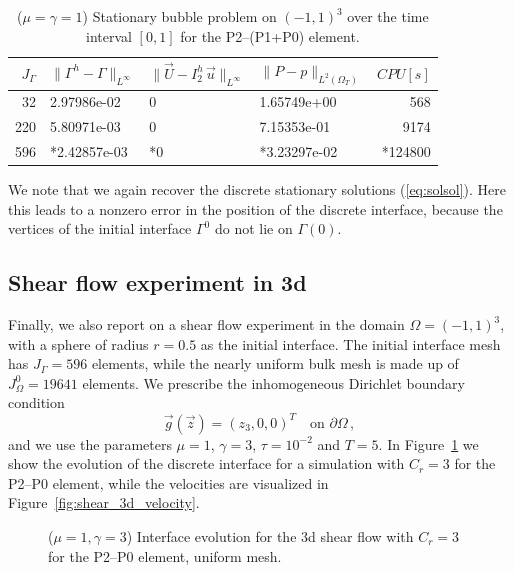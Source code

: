 \documentclass[a4paper,12pt,onecolumn]{article}
\newcommand{\errorXx}{\|\Gamma^h - \Gamma\|_{L^\infty}}
\newcommand{\errorUu}[1]{\|\vec U - I^h_{#1}\,\vec u\|_{L^\infty}}
\newcommand{\LerrorPp}{\|P - p\|_{L^2(\Omega_T)}}
\begin{document}
\begin{table}
 \center
\begin{tabular}{rlllr}
\hline
$J_\Gamma$ & $\errorXx$ & $\errorUu2$ & $\LerrorPp$ & $CPU[s]$ \\
\hline
 32 & 2.97986e-02 & 0 & 1.65749e+00 &  568 \\
220 & 5.80971e-03 & 0 & 7.15353e-01 & 9174 \\
596 & *2.42857e-03& *0 & *3.23297e-02 & *124800\\
\hline
\end{tabular}
\caption{($\mu=\gamma=1$) Stationary bubble problem on $(-1,1)^3$ over the time interval $[0,1]$ for the P2--(P1+P0) element.}
\label{tab:bubble3Dp2p1p0}
\end{table}

We note that we again recover the discrete stationary solutions
(\ref{eq:solsol}). Here this leads to a nonzero error in the position of the
discrete interface, because the vertices of the initial interface $\Gamma^0$ do
not lie on $\Gamma(0)$.

\subsection{Shear flow experiment in 3d}
Finally, we also report on a shear flow experiment in the domain 
$\Omega=(-1,1)^3$, with a sphere of radius $r=0.5$ as the initial interface. 
The initial interface mesh has $J_\Gamma = 596$ elements, while the nearly uniform
bulk mesh is made up of $J_\Omega^0 = 19641$ elements.
We prescribe the inhomogeneous Dirichlet boundary condition
\begin{equation*}
\vec g(\vec z)=(z_3,0,0)^T\quad \mbox{on }\partial\Omega\,,
\end{equation*}
and we use the parameters $\mu=1$, $\gamma=3$, $\tau=10^{-2}$ and $T=5$. 
In Figure~\ref{fig:shear_3d} we show the evolution of the discrete interface
for a simulation with $C_r=3$ for the P2--P0 element, while the velocities
are visualized in Figure~\ref{fig:shear_3d_velocity}.
\begin{figure}[htbp]
  \centering
  \caption{($\mu=1,\gamma=3$) Interface evolution for the 3d shear flow with $C_r=3$ for the P2--P0 element, uniform mesh.}
  \label{fig:shear_3d}
\end{figure}
\end{document}
